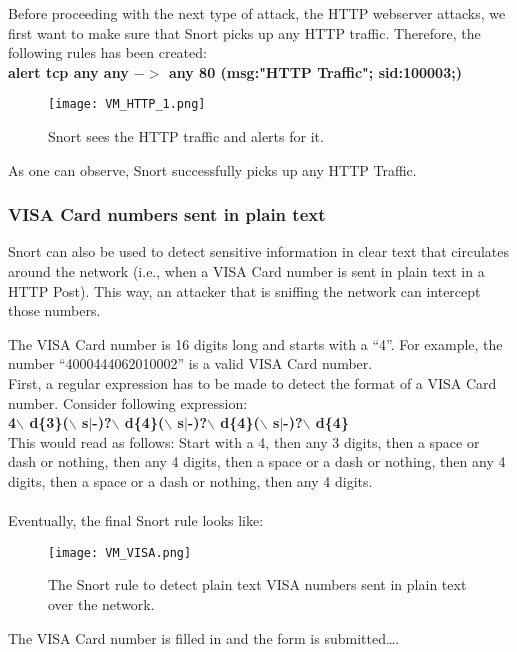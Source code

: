 Before proceeding with the next type of attack, the HTTP webserver attacks, we first want to make sure that Snort picks up any HTTP traffic. Therefore, the following rules has been created: \\

\textbf{alert tcp any any $->$ any 80 (msg:"HTTP Traffic"; sid:100003;)} \\

\begin{figure}[h]
    \centering
    \texttt{[image: VM\_HTTP\_1.png]}
    \caption{Snort sees the HTTP traffic and alerts for it.}
\end{figure}

As one can observe, Snort successfully picks up any HTTP Traffic.

\subsubsection{VISA Card numbers sent in plain text}

Snort can also be used to detect sensitive information in clear text that circulates around the network (i.e., when a VISA Card number is sent in plain text in a HTTP Post). This way, an attacker that is sniffing the network can intercept those numbers.

The VISA Card number is 16 digits long and starts with a ``4''. For example, the number ``4000444062010002'' is a valid VISA Card number. \\

First, a regular expression has to be made to detect the format of a VISA Card number. Consider following expression: \\
\textbf{4$\backslash$ d\{3\}($\backslash$ s$|$-)?$\backslash$ d\{4\}($\backslash$ s$|$-)?$\backslash$ d\{4\}($\backslash$ s$|$-)?$\backslash$ d\{4\}} \\
This would read as follows: Start with a 4, then any 3 digits, then a space or dash or nothing, then any 4 digits, then a space or a dash or nothing, then any 4 digits, then a space or a dash or nothing, then any 4 digits. \\ \\
Eventually, the final Snort rule looks like: 

\begin{figure}[h]
    \centering
    \texttt{[image: VM\_VISA.png]}
    \caption{The Snort rule to detect plain text VISA numbers sent in plain text over the network.}
\end{figure}
\clearpage
The VISA Card number is filled in and the form is submitted\ldots.

